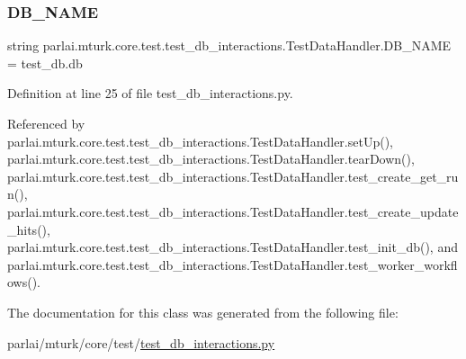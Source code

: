 \subsubsection{\texorpdfstring{D\+B\+\_\+\+N\+A\+ME}{DB\_NAME}}
{\footnotesize\ttfamily string parlai.\+mturk.\+core.\+test.\+test\+\_\+db\+\_\+interactions.\+Test\+Data\+Handler.\+D\+B\+\_\+\+N\+A\+ME = \textquotesingle{}test\+\_\+db.\+db\textquotesingle{}\hspace{0.3cm}{\ttfamily [static]}}



Definition at line 25 of file test\+\_\+db\+\_\+interactions.\+py.



Referenced by parlai.\+mturk.\+core.\+test.\+test\+\_\+db\+\_\+interactions.\+Test\+Data\+Handler.\+set\+Up(), parlai.\+mturk.\+core.\+test.\+test\+\_\+db\+\_\+interactions.\+Test\+Data\+Handler.\+tear\+Down(), parlai.\+mturk.\+core.\+test.\+test\+\_\+db\+\_\+interactions.\+Test\+Data\+Handler.\+test\+\_\+create\+\_\+get\+\_\+run(), parlai.\+mturk.\+core.\+test.\+test\+\_\+db\+\_\+interactions.\+Test\+Data\+Handler.\+test\+\_\+create\+\_\+update\+\_\+hits(), parlai.\+mturk.\+core.\+test.\+test\+\_\+db\+\_\+interactions.\+Test\+Data\+Handler.\+test\+\_\+init\+\_\+db(), and parlai.\+mturk.\+core.\+test.\+test\+\_\+db\+\_\+interactions.\+Test\+Data\+Handler.\+test\+\_\+worker\+\_\+workflows().



The documentation for this class was generated from the following file\+:\begin{DoxyCompactItemize}
\item 
parlai/mturk/core/test/\hyperlink{test_2test__db__interactions_8py}{test\+\_\+db\+\_\+interactions.\+py}\end{DoxyCompactItemize}
